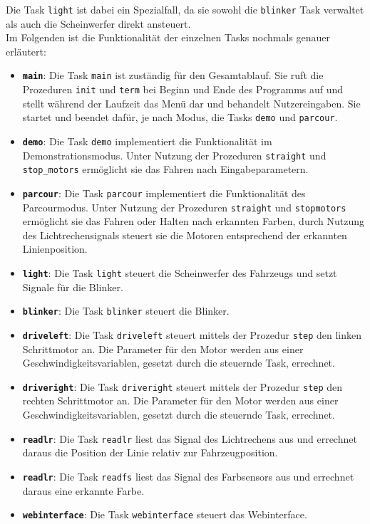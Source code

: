 Die Task \texttt{light} ist dabei ein Spezialfall, da sie sowohl die \texttt{blinker} Task verwaltet als auch die Scheinwerfer direkt ansteuert.\\

Im Folgenden ist die Funktionalität der einzelnen Tasks nochmals genauer erläutert:
\begin{itemize}
	\item \textbf{\texttt{main}}: Die Task \texttt{main} ist zuständig für den Gesamtablauf. Sie ruft die Prozeduren \texttt{init} und \texttt{term} bei Beginn und Ende des Programms auf und stellt während der Laufzeit das Menü dar und behandelt Nutzereingaben. Sie startet und beendet dafür, je nach Modus, die Tasks \texttt{demo} und \texttt{parcour}.
	
	\item \textbf{\texttt{demo}}: Die Task \texttt{demo} implementiert die Funktionalität im Demonstrationsmodus. Unter Nutzung der Prozeduren \texttt{straight} und \texttt{stop\_motors} ermöglicht sie das Fahren nach Eingabeparametern.
	
	\item \textbf{\texttt{parcour}}: Die Task \texttt{parcour} implementiert die Funktionalität des Parcourmodus. Unter Nutzung der Prozeduren \texttt{straight} und \texttt{stopmotors} ermöglicht sie das Fahren oder Halten nach erkannten Farben, durch Nutzung des Lichtrechensignals steuert sie die Motoren entsprechend der erkannten Linienposition.
	
	\item \textbf{\texttt{light}}: Die Task \texttt{light} steuert die Scheinwerfer des Fahrzeugs und setzt Signale für die Blinker.
	
	\item \textbf{\texttt{blinker}}: Die Task \texttt{blinker} steuert die Blinker.
	
	\item \textbf{\texttt{driveleft}}: Die Task \texttt{driveleft} steuert mittels der Prozedur \texttt{step} den linken Schrittmotor an. Die Parameter für den Motor werden aus einer Geschwindigkeitsvariablen, gesetzt durch die steuernde Task, errechnet.
	
	\item \textbf{\texttt{driveright}}: Die Task \texttt{driveright} steuert mittels der Prozedur \texttt{step} den rechten Schrittmotor an. Die Parameter für den Motor werden aus einer Geschwindigkeitsvariablen, gesetzt durch die steuernde Task, errechnet.
	
	\item \textbf{\texttt{readlr}}: Die Task \texttt{readlr} liest das Signal des Lichtrechens aus und errechnet daraus die Position der Linie relativ zur Fahrzeugposition.
	
	\item \textbf{\texttt{readlr}}: Die Task \texttt{readfs} liest das Signal des Farbsensors aus und errechnet daraus eine erkannte Farbe.
	
	\item \textbf{\texttt{webinterface}}: Die Task \texttt{webinterface} steuert das Webinterface.
\end{itemize}

